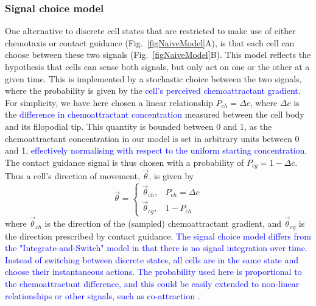 \documentclass[review]{elsarticle}
\newcommand\hl[1]{{\textcolor{blue}{#1}}}
\begin{document}
\subsubsection{Signal choice model\label{methodsSignalChoice}}
One alternative to discrete cell states that are restricted to make use of either chemotaxis or contact guidance (Fig.~\ref{figNaiveModel}A), is that each cell can choose between these two signals (Fig.~\ref{figNaiveModel}B). This model reflects the hypothesis that cells can sense both signals, but only act on one or the other at a given time. This is implemented by a stochastic choice between the two signals, where the probability is given by the \hl{cell's perceived chemoattractant gradient}. For simplicity, we have here chosen a linear relationship $P_{ch} = \Delta c$, where $\Delta c$ is the \hl{difference in chemoattractant concentration} measured between the cell body and its filopodial tip. This quantity is bounded between 0 and 1, as the chemoattractant concentration in our model is set in arbitrary units between 0 and 1, \hl{effectively normalising with respect to the uniform starting concentration}. The contact guidance signal is thus chosen with a probability of $P_{cg} = 1 - \Delta c$. Thus a cell's direction of movement, $\vec{\theta}$, is given by
\begin{equation} \label{eqnChoice}
     \vec{\theta} = 
         \begin{cases}
         \vec{\theta}_{ch}, & P_{ch} = \Delta c \\
        \vec{\theta}_{cg}, & 1 - P_{ch}
        \end{cases}
\end{equation}
where $\vec{\theta}_{ch}$ is the direction of the (sampled) chemoattractant gradient, and $\vec{\theta}_{cg}$ is the direction prescribed by contact guidance.
	\hl{The signal choice model differs from the "Integrate-and-Switch" model \cite{McLennan2015b} in that there is no signal integration over time. Instead of switching between discrete states, all cells are in the same state and choose their instantaneous actions. The probability used here is proportional to the chemoattractant difference, and this could be easily extended to non-linear relationships or other signals, such as co-attraction \cite{Carmona-Fontaine2011,Merchant2018}.}
\end{document}
